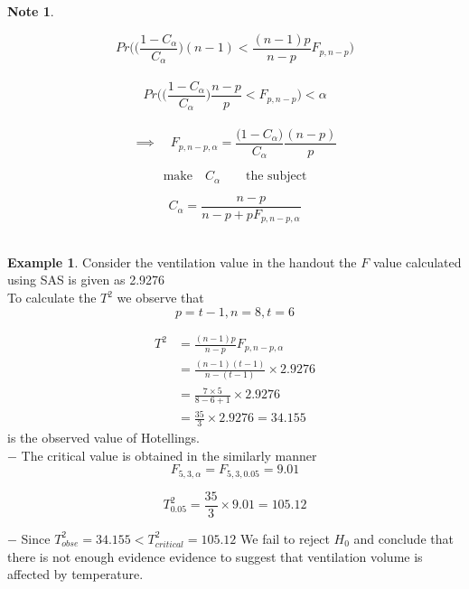 \documentclass[11pt,a4paper]{article}
\theoremstyle{definition}
\newtheorem{exa}[thm]{Example}
\newtheorem{note}[thm]{Note}
\begin{document}
\begin{note}
\begin{enumerate}
$$Pr\Bigg(\Bigg(\frac{1-C_{\alpha}}{C_{\alpha}}\Bigg)(n-1)<\frac{(n-1)p}{n-p}F_{p,n-p}\Bigg)$$\\


$$Pr\Bigg(\Bigg(\frac{1-C_{\alpha}}{C_{\alpha}}\Bigg)\frac{n-p}{p}<F_{p,n-p}\Bigg)<\alpha$$\\

$$\implies\quad  F_{p,n-p,\alpha}=\frac{\big(1-C_{\alpha}\big)}{C_{\alpha}}\frac{(n-p)}{p}$$

$$\text{make}\quad  C_{\alpha}\qquad \text{the subject}$$

$$C_{\alpha} = \frac{n-p}{n-p+pF_{p,n-p,\alpha}}$$\\
\end{enumerate}
\end{note}











\begin{exa}
Consider the ventilation value in the handout the $F$ value calculated using SAS is given as 2.9276\\
To calculate the $T^2$ we observe that 
$$p=t-1,  n =8,  t=6 $$
\end{exa}

\begin{align*}
T^2 & = \frac{(n-1)p}{n-p}F_{p,n-p,\alpha}\\
& = \frac{(n-1)(t-1)}{n-(t-1)}\times 2.9276\\
& = \frac{7\times 5}{8-6+1}\times 2.9276\\
& = \frac{35}{3}\times 2.9276 = 34.155
\end{align*}
 is the observed value of Hotellings.\\
 
$-$ The critical value is obtained in the similarly manner
$$ F_{5,3,\alpha}=F_{5,3,0.05}=9.01$$

$$T^2_{0.05}= \frac{35}{3}\times 9.01=105.12$$

$-$ Since $T^2_{obse} = 34.155< T^2_{critical} =105.12$
We fail to reject $H_0$ and conclude that there is not enough evidence evidence to suggest that ventilation volume is affected by temperature.\\\\
\end{document}
